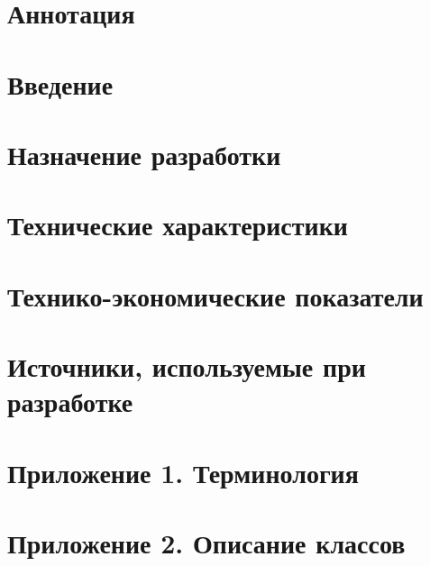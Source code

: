 \documentclass[
encoding=utf8
]{twoeskd}
\newcommand{\+}{\discretionary{\mbox{\scriptsize$\hookleftarrow$}}{}{}}
\begin{document}

\section{Аннотация}


\newpage
{}
\tableofcontents

\newpage
\section{Введение}


\newpage
\section{Назначение разработки}


\newpage
\section{Технические характеристики}


\newpage
\section{Технико-экономические показатели}


\newpage
\section{Источники, используемые при разработке}


\newpage
\section{Приложение 1. Терминология}


\newpage
\section{Приложение 2. Описание классов}


\newpage

\eskdListOfChanges

\end{document}
